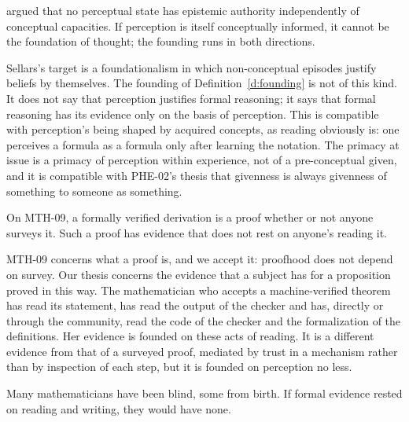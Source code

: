 \documentclass{situationist-preprint}
\begin{document}
\begin{objection}
\citet{Sellars1956} argued that no perceptual state has epistemic authority independently of conceptual capacities. If perception is itself conceptually informed, it cannot be the foundation of thought; the founding runs in both directions.
\end{objection}

\begin{reply}
Sellars's target is a foundationalism in which non-conceptual episodes justify beliefs by themselves. The founding of Definition~\ref{d:founding} is not of this kind. It does not say that perception justifies formal reasoning; it says that formal reasoning has its evidence only on the basis of perception. This is compatible with perception's being shaped by acquired concepts, as reading obviously is: one perceives a formula as a formula only after learning the notation. The primacy at issue is a primacy of perception within experience, not of a pre-conceptual given, and it is compatible with PHE-02's thesis that givenness is always givenness of something to someone as something.
\end{reply}

\begin{objection}
On MTH-09, a formally verified derivation is a proof whether or not anyone surveys it. Such a proof has evidence that does not rest on anyone's reading it.
\end{objection}

\begin{reply}
MTH-09 concerns what a proof is, and we accept it: proofhood does not depend on survey. Our thesis concerns the evidence that a subject has for a proposition proved in this way. The mathematician who accepts a machine-verified theorem has read its statement, has read the output of the checker and has, directly or through the community, read the code of the checker and the formalization of the definitions. Her evidence is founded on these acts of reading. It is a different evidence from that of a surveyed proof, mediated by trust in a mechanism rather than by inspection of each step, but it is founded on perception no less.
\end{reply}

\begin{objection}
Many mathematicians have been blind, some from birth. If formal evidence rested on reading and writing, they would have none.
\end{objection}
\end{document}
